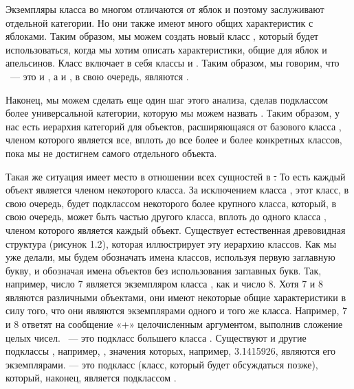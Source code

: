 Экземпляры класса  во многом отличаются от яблок и поэтому заслуживают 
отдельной категории. Но они также имеют много общих характеристик с яблоками. 
Таким образом, мы можем создать новый класс , который будет использоваться, 
когда мы хотим описать характеристики, общие для яблок и апельсинов. Класс 
 включает в себя классы  и . Таким образом, мы говорим, 
что \ --- это   и , а  и , в свою 
очередь, являются  .

Наконец, мы можем сделать еще один шаг этого анализа, сделав  подклассом 
более универсальной категории, которую мы можем назвать . Таким образом, 
у нас есть иерархия категорий для объектов, расширяющаяся от базового класса 
, членом которого является все, вплоть до все более и более конкретных 
классов, пока мы не достигнем самого отдельного объекта.

Такая же ситуация имеет место в отношении всех сущностей в \st. То есть 
каждый объект является членом некоторого класса. За исключением класса , 
этот класс, в свою очередь, будет подклассом некоторого более крупного класса, 
который, в свою очередь, может быть частью другого класса, вплоть до одного 
класса , членом которого является каждый объект. Существует естественная 
древовидная структура (рисунок 1.2), которая иллюстрирует эту иерархию классов. 
Как мы уже делали, мы будем обозначать имена классов, используя первую заглавную 
букву, и обозначая имена объектов без использования заглавных букв. Так, 
например, число 7 является экземпляром класса , как и число 8. Хотя 
7 и 8 являются различными объектами, они имеют некоторые общие характеристики 
в силу того, что они являются экземплярами одного и того же класса. Например, 
7 и 8 ответят на сообщение «+» целочисленным аргументом, выполнив сложение 
целых чисел. \ --- это подкласс большего класса . Существуют и 
другие подклассы , например, , значения которых, например, 
3.1415926, являются его экземплярами.  --- это подкласс  (класс, 
который будет обсуждаться позже), который, наконец, является подклассом .


